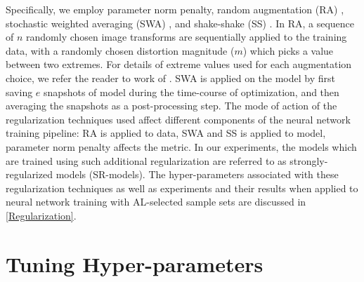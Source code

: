 \documentclass[10pt,twocolumn,letterpaper]{article}
\begin{document}
Specifically, we employ parameter norm penalty, random augmentation (RA) \cite{cubuk2019randaugment}, stochastic weighted averaging (SWA) \cite{SWA_izmailov2018averaging}, and shake-shake (SS) \cite{shake-shake_gastaldi2017shake}. In RA, a sequence of $n$ randomly chosen image transforms are sequentially applied to the training data, with a randomly chosen distortion magnitude ($m$) which picks a value between two extremes. For details of extreme values used for each augmentation choice, we refer the reader to work of \cite{cubuk2018autoaugment}. SWA is applied on the model by first saving $e$ snapshots of model during the time-course of optimization, and then averaging the snapshots as a post-processing step. The mode of action of the regularization techniques used affect different components of the neural network training pipeline: RA is applied to data, SWA and SS is applied to model, parameter norm penalty affects the metric. In our experiments, the models which are trained using such additional regularization are referred to as strongly-regularized models (SR-models). The hyper-parameters associated with these regularization techniques as well as experiments and their results when applied to neural network training with AL-selected sample sets are discussed in \cref{Regularization}.


\section{Tuning Hyper-parameters}
\end{document}
